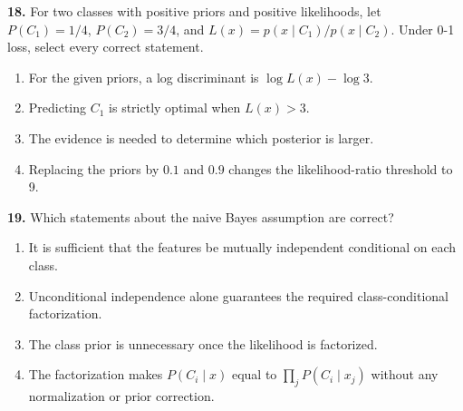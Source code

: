 \documentclass[11pt,a4paper]{article}
\begin{document}
\par\noindent\begin{minipage}{\linewidth}
\textbf{18.} For two classes with positive priors and positive likelihoods, let \(P(C_1)=1/4\), \(P(C_2)=3/4\), and \(L(x)=p(x\mid C_1)/p(x\mid C_2)\). Under 0-1 loss, select every correct statement.
\begin{enumerate}[label=(\Alph*),leftmargin=8mm,itemsep=2pt,topsep=2pt]
\item For the given priors, a log discriminant is \(\log L(x)-\log3\).
\item Predicting \(C_1\) is strictly optimal when \(L(x)>3\).
\item The evidence is needed to determine which posterior is larger.
\item Replacing the priors by \(0.1\) and \(0.9\) changes the likelihood-ratio threshold to 9.
\end{enumerate}

\end{minipage}\par\vspace{3mm}
\par\noindent\begin{minipage}{\linewidth}
\textbf{19.} Which statements about the naive Bayes assumption are correct?
\begin{enumerate}[label=(\Alph*),leftmargin=8mm,itemsep=2pt,topsep=2pt]
\item It is sufficient that the features be mutually independent conditional on each class.
\item Unconditional independence alone guarantees the required class-conditional factorization.
\item The class prior is unnecessary once the likelihood is factorized.
\item The factorization makes \(P(C_i\mid x)\) equal to \(\prod_jP(C_i\mid x_j)\) without any normalization or prior correction.
\end{enumerate}

\end{minipage}\par\vspace{3mm}
\end{document}
